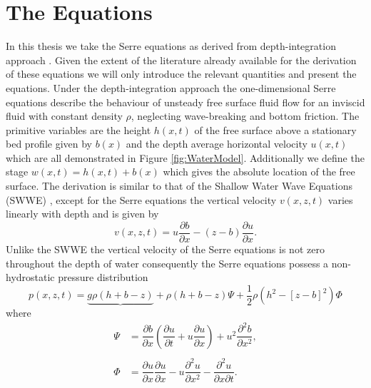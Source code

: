 \section{The Equations}
In this thesis we take the Serre equations as derived from depth-integration approach \cite{Su-Gardener-1969-536,Seabra-Santos-etal-1987-117}. Given the extent of the literature already available for the derivation of these equations we will only introduce the relevant quantities and present the equations. Under the depth-integration approach the one-dimensional Serre equations describe the behaviour of unsteady free surface fluid flow for an inviscid fluid with constant density $\rho$, neglecting wave-breaking and bottom friction. The primitive variables are the height $h(x,t)$ of the free surface above a stationary bed profile given by $b(x)$ and the depth average horizontal velocity $u(x,t)$ which are all demonstrated in Figure \ref{fig:WaterModel}. Additionally we define the stage $w(x,t) = h(x,t) + b(x)$ which gives the absolute location of the free surface. The derivation is similar to that of the Shallow Water Wave Equations (SWWE) \cite{Liggett-1994}, except for the Serre equations the vertical velocity $v(x,z,t)$ varies linearly with depth and is given by \cite{Zoppou-2014}
\begin{equation}
v(x,z,t) = u \frac{\partial b}{\partial x} - (z - b) \frac{\partial u}{\partial x}.
\label{eqn:VertVelSerre}
\end{equation}
Unlike the SWWE the vertical velocity of the Serre equations is not zero throughout the depth of water consequently the Serre equations possess a non-hydrostatic pressure distribution
\begin{equation}
\label{eqn:SerrePress}
 p(x,z,t) = \underbrace{g \rho \left(h + b - z\right)} + \rho \left(h + b - z\right) \Psi + \frac{1}{2} \rho \left(h^2 - \left[z - b \right]^2\right) {\Phi }
\end{equation} 
where
\begin{subequations}
	\begin{align}
	{ \Psi }  &= \dfrac{\partial b}{\partial x}\left(\dfrac{\partial u}{\partial t} + u\dfrac{\partial u}{\partial x} \right)  + u^2\dfrac{\partial^2 b}{\partial x^2}, \label{eqn:SerreeqnPsi} \\ \nonumber \\
	{ \Phi }  &= \dfrac{\partial u }{\partial x} \dfrac{\partial u}{\partial x} -u \dfrac{\partial^2 u}{\partial x^2}  - \dfrac{\partial^2 u}{\partial x \partial t} . \label{eqn:SerreeqnPhi} 
	\end{align}
	\label{eqn:FullSerreNonConVarDef}
\end{subequations}
